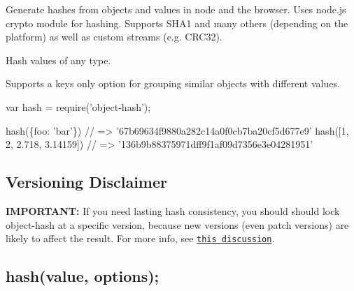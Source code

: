 Generate hashes from objects and values in node and the browser. Uses node.\+js crypto module for hashing. Supports S\+H\+A1 and many others (depending on the platform) as well as custom streams (e.\+g. C\+R\+C32).

\href{https://www.npmjs.com/package/object-hash}{\tt } \href{https://www.npmjs.com/package/object-hash}{\tt }

\href{https://secure.travis-ci.org/puleos/object-hash?branch=master}{\tt } \href{https://coveralls.io/github/puleos/object-hash?branch=master}{\tt }


\begin{DoxyItemize}
\item Hash values of any type.
\item Supports a keys only option for grouping similar objects with different values.
\end{DoxyItemize}


\begin{DoxyCode}
var hash = require('object-hash');

hash(\{foo: 'bar'\}) // => '67b69634f9880a282c14a0f0cb7ba20cf5d677e9'
hash([1, 2, 2.718, 3.14159]) // => '136b9b88375971dff9f1af09d7356e3e04281951'
\end{DoxyCode}


\subsection*{Versioning Disclaimer}

{\bfseries I\+M\+P\+O\+R\+T\+A\+NT\+:} If you need lasting hash consistency, you should should lock {\ttfamily object-\/hash} at a specific version, because new versions (even patch versions) are likely to affect the result. For more info, see \href{https://github.com/puleos/object-hash/issues/30}{\tt this discussion}.

\subsection*{hash(value, options);}

